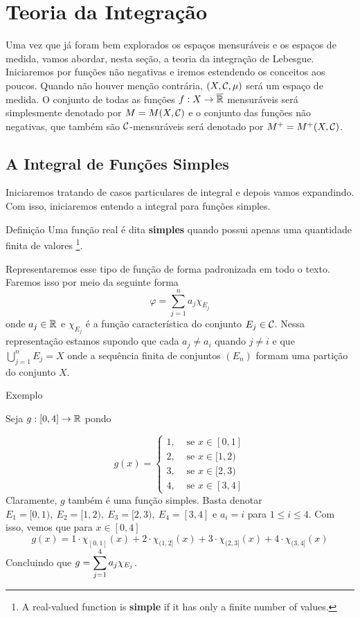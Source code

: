 \chapter{Teoria da Integração}
Uma vez que já foram bem explorados os espaços mensuráveis e os espaços de medida, vamos abordar, nesta seção, a teoria da integração de Lebesgue.
Iniciaremos por funções não negativas e iremos estendendo os conceitos aos poucos.
Quando não houver menção contrária, $(X, \operatorname{\mathcal{C}}, \mu)$ será um espaço de medida.
O conjunto de todas as funções $f:X \to \operatorname{\overline{\mathbb{R}}}$ mensuráveis será simplesmente denotado por $M = M(X, \operatorname{\mathcal{C}})$ e o conjunto das funções não negativas, que também são $\operatorname{\mathcal{C}}$-mensuráveis será denotado por $M^+ = M^+(X, \operatorname{\mathcal{C}})$. 

\section{A Integral de Funções Simples}
	Iniciaremos tratando de casos particulares de integral e depois vamos expandindo.
	Com isso, iniciaremos entendo a integral para funções simples.

\begin{env}{Definição}
    Uma função real é dita \textbf{simples} quando possui apenas uma quantidade finita de valores \cite[p.27, tradução nossa]{bartle}
    \footnote{A real-valued function is \textbf{simple} if it has only a finite number of values.}.
\end{env}

Representaremos esse tipo de função de forma padronizada em todo o texto.
Faremos isso por meio da seguinte forma
$$
\varphi =  \sum_{j = 1}^n a_j\chi_{E_j}
$$
onde $a_j \in \mathbb{R}$ e $\chi_{E_j}$ é a função característica do conjunto $E_j \in \operatorname{\mathcal{C}}$.
Nessa representação estamos supondo que cada $a_j \neq a_i$ quando $j \neq i$ e que
$\displaystyle \bigcup_{j = 1}^n E_j = X$ onde a sequência finita de conjuntos $(E_n)$ formam uma partição do conjunto $X$.

\begin{env}{Exemplo}
\label{ex:função-escada-part-2}

    Seja $g: [0,4] \to \mathbb{R}$ pondo 
    
    $$g(x) = \left\{
    \begin{array}{cc}
         1, & \textrm{\ se } x \in [0,1] \\
         2, & \textrm{\ se } x \in [1,2) \\
         3, & \textrm{\ se } x \in [2,3) \\
         4, & \textrm{\ se } x \in [3,4]
    \end{array}\right.
    $$
    Claramente, $g$ também é uma função simples.
    Basta denotar 
    $E_1 = [0,1),\ 
     E_2 = [1,2),\   
     E_3 = [2,3),\  
     E_4 = [3,4]$ e 
     $ a_i = i$ para $1 \leq i \leq 4$.
    Com isso, vemos que para $x \in [0,4]$
    $$
    g(x) = 1\cdot \chi_{[0,1]}(x) + 2\cdot \chi_{(1,2]}(x) + 3\cdot \chi_{(2,3]}(x) + 4\cdot \chi_{(3,4]}(x)
    $$
    Concluindo que $g = \displaystyle \sum_{j = 1}^4 a_j\chi_{E_j}$. 
\end{env}

